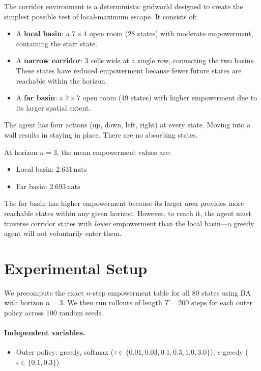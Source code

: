 \documentclass[11pt]{article}
\newcommand{\nats}{\,\mathrm{nats}}
\begin{document}
The corridor environment is a deterministic gridworld designed to
create the simplest possible test of local-maximum escape.  It
consists of:

\begin{itemize}
  \item A \textbf{local basin}: a $7 \times 4$ open room (28 states)
    with moderate empowerment, containing the start state.
  \item A \textbf{narrow corridor}: 3 cells wide at a single row,
    connecting the two basins.  These states have reduced empowerment
    because fewer future states are reachable within the horizon.
  \item A \textbf{far basin}: a $7 \times 7$ open room (49 states)
    with higher empowerment due to its larger spatial extent.
\end{itemize}

The agent has four actions (up, down, left, right) at every state.
Moving into a wall results in staying in place.  There are no
absorbing states.

\medskip

At horizon $n = 3$, the mean empowerment values are:
\begin{itemize}
  \item Local basin: $2.631\nats$
  \item Far basin: $2.693\nats$
\end{itemize}

The far basin has higher empowerment because its larger area provides
more reachable states within any given horizon.  However, to reach it,
the agent must traverse corridor states with \emph{lower} empowerment
than the local basin---a greedy agent will not voluntarily enter them.

\section{Experimental Setup}
\label{sec:setup}

We precompute the exact $n$-step empowerment table for all 80 states
using BA with horizon $n = 3$.  We then run rollouts of length
$T = 200$ steps for each outer policy across 100 random seeds.

\paragraph{Independent variables.}
\begin{itemize}
  \item Outer policy: greedy, softmax ($\tau \in \{0.01, 0.03, 0.1, 0.3, 1.0, 3.0\}$),
    $\epsilon$-greedy ($\epsilon \in \{0.1, 0.3\}$)
\end{itemize}
\end{document}
